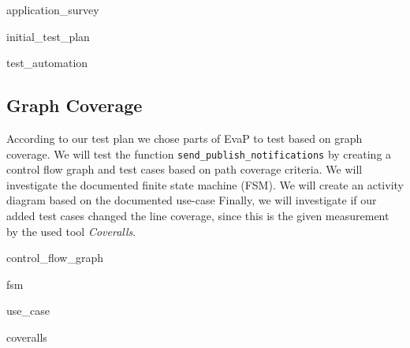 {application_survey}

{initial_test_plan}

{test_automation}

\subsection{Graph Coverage}
According to our test plan we chose parts of EvaP to test based on graph coverage. 
We will test the function \texttt{send\_publish\_notifications} by creating a control flow graph and test cases based on path coverage criteria. 
We will investigate the documented finite state machine (FSM). 
We will create an activity diagram based on the documented use-case %
Finally, we will investigate if our added test cases changed the line coverage, since this is the given measurement by the used tool \textit{Coveralls}.

{control_flow_graph}

{fsm}

{use_case}

{coveralls}
